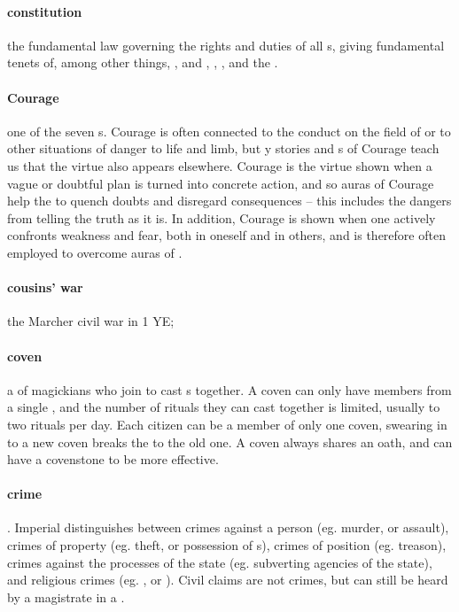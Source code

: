 \paragraph{constitution} the fundamental law governing the rights and duties of all s, giving fundamental tenets of, among other things, ,  and , , ,  and the .
\paragraph{Courage} one of the seven s. Courage is often connected to the conduct on the field of  or to other situations of danger to life and limb, but y stories and s of Courage teach us that the virtue also appears elsewhere. Courage is the virtue shown when a vague or doubtful plan is turned into concrete action, and so auras of Courage help the  to quench doubts and disregard consequences – this includes the dangers from telling the truth as it is. In addition, Courage is shown when one actively confronts weakness and fear, both in oneself and in others, and is therefore often employed to overcome auras of .
\paragraph{cousins' war} the Marcher civil war in 1 YE; 
\paragraph{coven} a  of magickians who join to cast s together. A coven can only have members from a single , and the number of rituals they can cast together is limited, usually to two rituals per day. Each citizen can be a member of only one coven, swearing in to a new coven breaks the  to the old one. A coven always shares an oath, and can have a covenstone to be more effective. 
\paragraph{crime} . Imperial  distinguishes between crimes against a person (eg. murder, or assault), crimes of property (eg. theft, or possession of s), crimes of position (eg. treason), crimes against the processes of the state (eg. subverting agencies of the state), and religious crimes (eg. , or ). Civil claims are not crimes, but can still be heard by a magistrate in a . 
